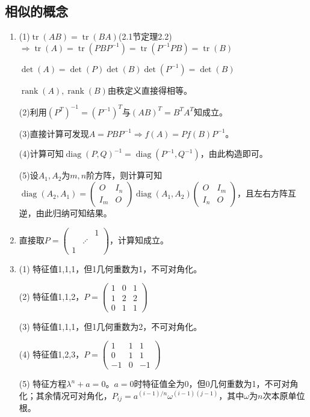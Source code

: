 \documentclass[a4paper,UTF8,fontset=windows]{ctexart}
\DeclareMathOperator{\diag}{diag}
\DeclareMathOperator{\rank}{rank}
\DeclareMathOperator{\tr}{tr}
\begin{document}
\subsection{相似的概念}
\begin{enumerate}
\item
(1)$\tr(AB)=\tr(BA)$(2.1节定理2.2)$\Rightarrow\tr(A)=\tr(PBP^{-1})=\tr(P^{-1}PB)=\tr(B)$

$\det(A)=\det(P)\det(B)\det(P^{-1})=\det(B)$

$\rank(A),\rank(B)$由秩定义直接得相等。

(2)利用$(P^T)^{-1}=(P^{-1})^T$与$(AB)^T=B^TA^T$知成立。

(3)直接计算可发现$A=PBP^{-1}\Rightarrow f(A)=Pf(B)P^{-1}$。

(4)计算可知$\diag(P,Q)^{-1}=\diag(P^{-1},Q^{-1})$，由此构造即可。

(5)设$A_1,A_2$为$m,n$阶方阵，则计算可知$\diag(A_2,A_1)=\begin{pmatrix}O&I_n\\I_m&O\end{pmatrix}\diag(A_1,A_2)\begin{pmatrix}O&I_m\\I_n&O\end{pmatrix}$，且左右方阵互逆，由此归纳可知结果。

\item
直接取$P=\begin{pmatrix}&&1\\&\iddots&\\1&&\end{pmatrix}$，计算知成立。

\item
(1) 特征值1,1,1，但1几何重数为1，不可对角化。

(2) 特征值1,1,2，$P=\begin{pmatrix}1&0&1\\1&2&2\\0&1&1\end{pmatrix}$

(3) 特征值1,1,1，但1几何重数为2，不可对角化。

(4) 特征值1,2,3，$P=\begin{pmatrix}1&1&1\\0&1&1\\-1&0&-1\end{pmatrix}$

(5) 特征方程$\lambda^n+a=0$。$a=0$时特征值全为0，但0几何重数为1，不可对角化；其余情况可对角化，$P_{ij}=a^{(i-1)/n}\omega^{(i-1)(j-1)}$，其中$\omega$为$n$次本原单位根。


\end{enumerate}
\end{document}
